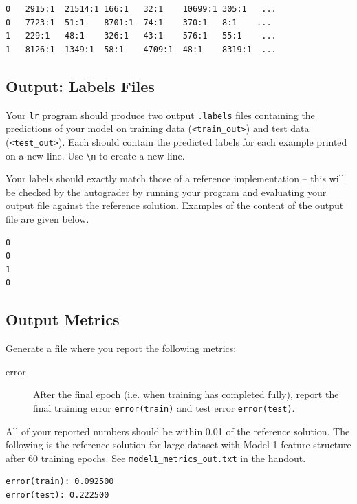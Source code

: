 \documentclass[11pt,addpoints,answers]{exam}
\begin{document}
\begin{lstlisting}
0	2915:1	21514:1	166:1	32:1	10699:1	305:1	...
0	7723:1	51:1	8701:1	74:1	370:1	8:1    ...
1	229:1	48:1	326:1	43:1	576:1	55:1	...
1	8126:1	1349:1	58:1	4709:1	48:1	8319:1	...
\end{lstlisting}


\subsection{Output: Labels Files} \label{output}
Your \lstinline{lr} program should produce two output \texttt{.labels} files containing the predictions of your model on training data (\texttt{<train\_out>}) and test data (\texttt{<test\_out>}). Each should contain the predicted labels for each example printed on a new line. Use \lstinline{\n} to create a new line. 

Your labels should exactly match those of a reference implementation -- this will be checked by the autograder by running your program and evaluating your output file against the reference solution. Examples of the content of the output file are given below.

\begin{lstlisting}
0
0
1
0
\end{lstlisting}

\subsection{Output Metrics} \label{metrics}
Generate a file where you report the following metrics: 

\begin{description}

\item[error] After the final epoch (i.e. when training has completed fully), report the final training error \newline \lstinline{error(train)} and test error \lstinline{error(test)}. 
\end{description}

All of your reported numbers should be within 0.01 of the reference solution. The following is the reference solution for large dataset with Model 1 feature structure after 60 training epochs. See \newline \lstinline{model1_metrics_out.txt} in the handout.

\begin{lstlisting}
error(train): 0.092500
error(test): 0.222500
\end{lstlisting}
\end{document}

